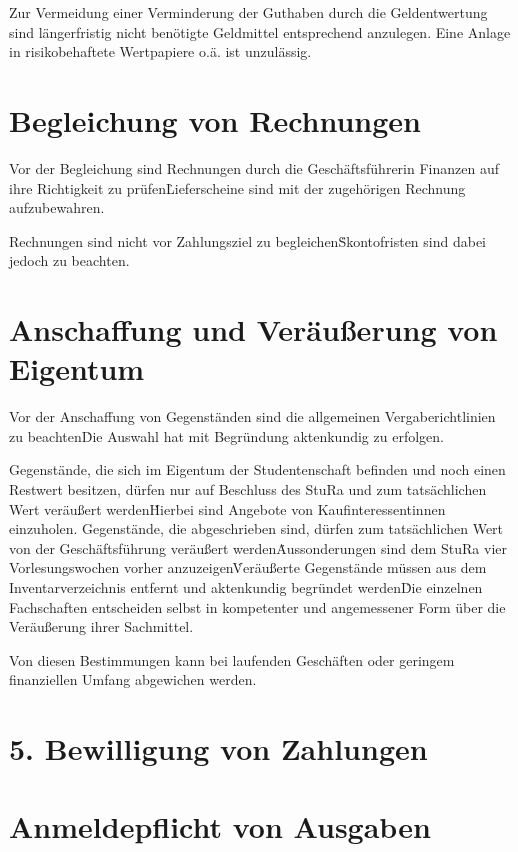 {\begin{multicols}{2}
\Abs \Satz Zur Vermeidung einer Verminderung der Guthaben durch die Geldentwertung sind längerfristig nicht benötigte Geldmittel entsprechend anzulegen. Eine Anlage in risikobehaftete Wertpapiere o.ä. ist unzulässig.



\section{Begleichung von Rechnungen}

\Abs \Satz Vor der Begleichung sind Rechnungen durch die Geschäftsführerin Finanzen auf ihre Richtigkeit zu prüfen\. Lieferscheine sind mit der zugehörigen Rechnung aufzubewahren.

\Abs \Satz Rechnungen sind nicht vor Zahlungsziel zu begleichen\. Skontofristen sind dabei jedoch zu beachten.



\section{Anschaffung und Veräußerung von Eigentum}

\Abs \Satz Vor der Anschaffung von Gegenständen sind die allgemeinen Vergaberichtlinien zu beachten\. Die Auswahl hat mit Begründung aktenkundig zu erfolgen.

\Abs \Satz Gegenstände, die sich im Eigentum der Studentenschaft befinden und noch einen Restwert besitzen, dürfen nur auf Beschluss des StuRa und zum tatsächlichen Wert veräußert werden\. Hierbei sind Angebote von Kaufinteressentinnen einzuholen. Gegenstände, die abgeschrieben sind, dürfen zum tatsächlichen Wert von der Geschäftsführung veräußert werden\. Aussonderungen sind dem StuRa vier Vorlesungswochen vorher anzuzeigen\. Veräußerte Gegenstände müssen aus dem Inventarverzeichnis entfernt und aktenkundig begründet werden\. Die einzelnen Fachschaften entscheiden selbst in kompetenter und angemessener Form über die Veräußerung ihrer Sachmittel.

\Abs \Satz Von diesen Bestimmungen kann bei laufenden Geschäften oder geringem finanziellen Umfang abgewichen werden.


\section*{5. Bewilligung von Zahlungen}



\section{Anmeldepflicht von Ausgaben}


\end{multicols}}
